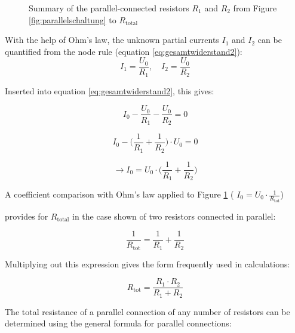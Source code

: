 \begin{frame}
{\begin{figure}[h!]
\begin{center}
			\end{center}
			\caption{Summary of the parallel-connected resistors $R_1$ and $R_2$ from Figure \ref{fig:parallelschaltung} to $R_\mathrm{total}$}
			\label{fig:parallelzusammen}
		\end{figure}
		
        With the help of Ohm's law, the unknown partial currents $I_1$ and $I_2$ can be quantified from the node rule (equation \ref{eq:gesamtwiderstand2}):		
		\begin{equation*}
			I_1 = \frac{U_0}{R_1}, \quad I_2 = \frac{U_0}{R_2}
		\end{equation*}
		
		Inserted into equation \ref{eq:gesamtwiderstand2}, this gives:
		
		
		
		\begin{equation*}
			I_0 - \frac{U_0}{R_1} - \frac{U_0}{R_2} = 0
		\end{equation*}
		
		
		\begin{equation*}
			I_0 - \bigg( \frac{1}{R_1}+\frac{1}{R_2} \bigg) \cdot U_0 = 0
		\end{equation*}
		
		\begin{equation*}
			\rightarrow I_0 = U_0 \cdot  \bigg( \frac{1}{R_1}+\frac{1}{R_2} \bigg)
		\end{equation*}
		
		
		A coefficient comparison with Ohm's law applied to Figure \ref{fig:parallelzusammen} 
		( $I_0 = U_0 \cdot \frac{1}{R_\mathrm{tot}}$)
		
		provides for $R_\mathrm{total}$ in the case shown of two resistors connected in parallel:
		
		\begin{equation*}
			\frac{1}{R_\mathrm{tot}} =  \frac{1}{R_1}+\frac{1}{R_2}
		\end{equation*}
		
		Multiplying out this expression gives the form frequently used in calculations:
		
		\begin{equation}
			R_\mathrm{tot} = \frac{R_1\cdot R_2}{R_1 + R_2}
			\label{eq:r2parallel}
		\end{equation}
		
		
		The total resistance of a parallel connection of any number of resistors can be determined using the general formula
		for parallel connections:
		
}
\end{frame}

